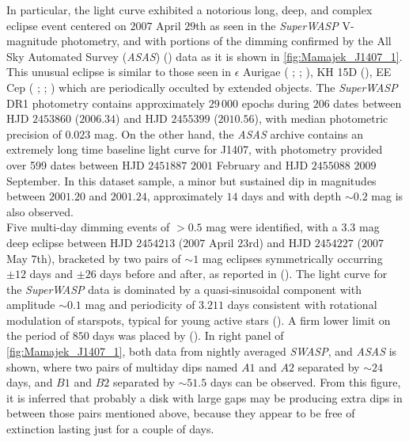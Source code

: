 In particular, the light curve exhibited a notorious long, deep, and complex eclipse event centered on $2007$ April $29$th as seen in the \textit{SuperWASP} V-magnitude photometry, and with portions of the dimming confirmed by the All Sky Automated Survey (\textit{ASAS})  (\citeyear{2002AcA....52..397P}) data as it is shown in \autoref{fig:Mamajek_J1407_1}. This unusual eclipse is similar to those seen in $\epsilon$ Aurigae ( \citeyear{2002ASPC..279..121G};  \citeyear{2010Natur.464..870K};  \citeyear{2011A&A...530A.146C}), KH 15D  (\citeyear{2006ApJ...644..510W}), EE Cep ( \citeyear{Mikolajewski1999};  \citeyear{2003A&A...403.1089G};  \citeyear{2010ASPC..435..423G}) which are periodically occulted by extended objects. The \textit{SuperWASP} DR1 photometry contains approximately $29\,000$ epochs during $206$ dates between HJD $2453860$ ($2006.34$) and HJD $2455399$ ($2010.56$), with median photometric precision  of $0.023$ mag. On the other hand, the \textit{ASAS} archive contains an extremely long time baseline light curve for J1407, with photometry provided over 599 dates between HJD $2451887$ $2001$ February and HJD $2455088$ $2009$ September. In this dataset sample, a minor but sustained dip in magnitudes between $2001.20$ and $2001.24$, approximately $14$ days and with depth $\sim 0.2$ mag is also observed.\\

Five multi-day dimming events of $>0.5$ mag were identified, with a $3.3$ mag deep eclipse between HJD $2454213$ ($2007$ April $23$rd) and HJD $ 2454227$ ($2007$ May $7$th), bracketed by two pairs of $\sim 1$ mag eclipses symmetrically occurring $\pm 12$ days and $\pm 26$ days before and after, as reported in  (\citeyear{2012AJ....143...72M}). The light curve for the \textit{SuperWASP} data is dominated by a quasi-sinusoidal component with amplitude $\sim0.1$ mag and periodicity of $3.211$ days consistent with rotational modulation of starspots, typical for young active stars  (\citeyear{2008ApJ...687.1264M}). A firm lower limit on the period of $850$ days was placed by  (\citeyear{2012AJ....143...72M}). In right panel of \autoref{fig:Mamajek_J1407_1}, both data from nightly averaged \textit{SWASP}, and \textit{ASAS} is shown, where two pairs of multiday dips named $A1$ and $A2$ separated by $\sim24$ days, and $B1$ and $B2$ separated by $\sim51.5$ days can be observed. From this figure, it is inferred that probably a disk with large gaps may be producing extra dips in between those pairs mentioned above, because they appear to be free of extinction lasting just for a couple of days.\\      
 
